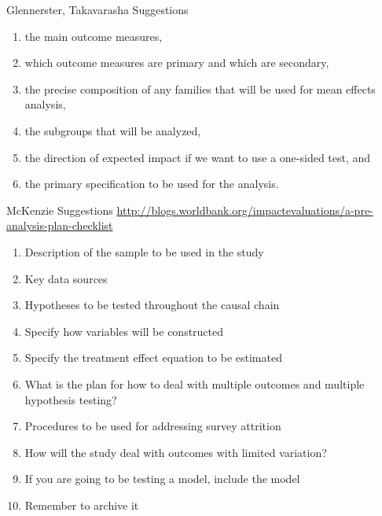 \documentclass{beamer}
\begin{document}
\begin{frame}{Glennerster, Takavarasha Suggestions}
\pause
\begin{enumerate}
\def\labelenumi{\arabic{enumi}.}
\item
  the main outcome measures,
\item
  which outcome measures are primary and which are secondary,
\item
  the precise composition of any families that will be used for mean
  effects analysis,
\item
  the subgroups that will be analyzed,
\item
  the direction of expected impact if we want to use a one-sided test,
  and
\item
  the primary specification to be used for the analysis.
\end{enumerate}
\end{frame}

\begin{frame}{McKenzie Suggestions}
\pause
\url{http://blogs.worldbank.org/impactevaluations/a-pre-analysis-plan-checklist}

\begin{enumerate}
\item
  Description of the sample to be used in the study
\item
  Key data sources
\item
  Hypotheses to be tested throughout the causal chain
\item
  Specify how variables will be constructed
\item
  Specify the treatment effect equation to be estimated
\item
  What is the plan for how to deal with multiple outcomes and multiple
  hypothesis testing?
\item
  Procedures to be used for addressing survey attrition
\item
  How will the study deal with outcomes with limited variation?
\item
  If you are going to be testing a model, include the model
\item
  Remember to archive it
\end{enumerate}
\end{frame}
\end{document}
